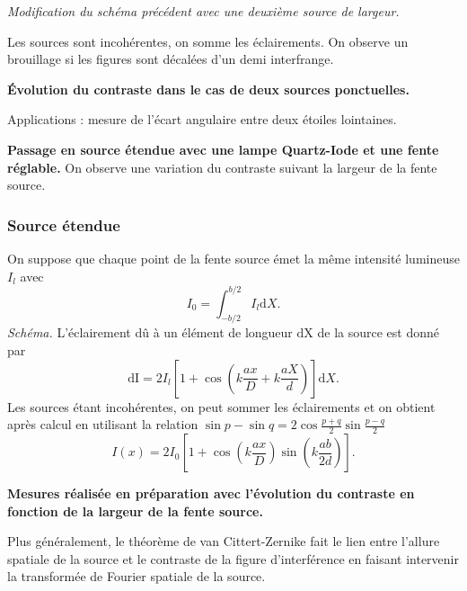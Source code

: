 \emph{Modification du schéma précédent avec une deuxième source de largeur.}

Les sources sont incohérentes, on somme les éclairements.
On observe un brouillage si les figures sont décalées d'un demi interfrange.

\begin{slide}
\textbf{Évolution du contraste dans le cas de deux sources ponctuelles.}
\end{slide}

Applications : mesure de l'écart angulaire entre deux étoiles lointaines.

\begin{experience}
\textbf{Passage en source étendue avec une lampe Quartz-Iode et une fente réglable.}
 On observe une variation du contraste suivant la largeur de la fente source.
\end{experience}

\subsubsection{Source étendue}

On suppose que chaque point de la fente source émet la même intensité lumineuse $I_l$ avec
\begin{equation}
I_0 = \int_{-b/2}^{b/2} I_l \mathrm{d}X.
\end{equation}
\emph{Schéma.}
L'éclairement dû à un élément de longueur $\mathrm{dX}$ de la source est donné par
\begin{equation}
\mathrm{dI} = 2I_l\left[1+\cos\left(k\frac{ax}{D}+k\frac{aX}{d}\right)\right]\mathrm{d}X.
\end{equation}
Les sources étant incohérentes, on peut sommer les éclairements et on obtient après calcul en utilisant la relation $\sin p - \sin q = 2\cos\frac{p+q}{2}\sin\frac{p-q}{2}$
\begin{equation}
I(x) = 2I_0\left[1+\cos\left(k\frac{ax}{D}\right)\sin\left(k\frac{ab}{2d}\right)\right].
\end{equation}

\begin{slide}
\textbf{Mesures réalisée en préparation avec l'évolution du contraste en fonction de la largeur de la fente source.}
\end{slide}

Plus généralement, le théorème de van Cittert-Zernike fait le lien entre l'allure spatiale de la source et le contraste de la figure d'interférence en faisant intervenir la transformée de Fourier spatiale de la source.

